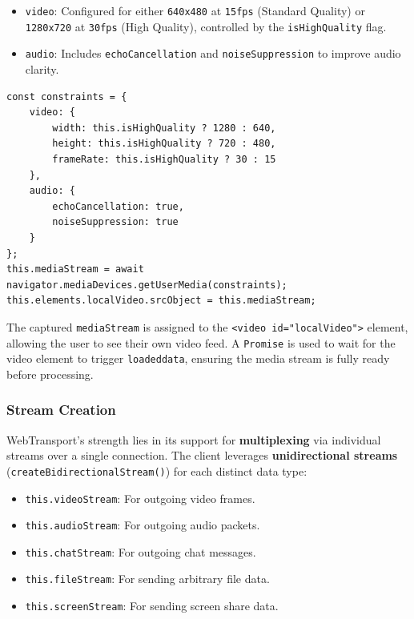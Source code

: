 \begin{itemize}
    \item \texttt{video}: Configured for either \texttt{640x480} at \texttt{15fps} (Standard Quality) or \texttt{1280x720} at \texttt{30fps} (High Quality), controlled by the \texttt{isHighQuality} flag.
    \item \texttt{audio}: Includes \texttt{echoCancellation} and \texttt{noiseSuppression} to improve audio clarity.
\end{itemize}

\begin{lstlisting}[breaklines=true,basicstyle=\small\ttfamily,frame=single]
const constraints = {
    video: {
        width: this.isHighQuality ? 1280 : 640,
        height: this.isHighQuality ? 720 : 480,
        frameRate: this.isHighQuality ? 30 : 15
    },
    audio: {
        echoCancellation: true,
        noiseSuppression: true
    }
};
this.mediaStream = await navigator.mediaDevices.getUserMedia(constraints);
this.elements.localVideo.srcObject = this.mediaStream;
\end{lstlisting}

The captured \texttt{mediaStream} is assigned to the \texttt{<video id="localVideo">} element, allowing the user to see their own video feed. A \texttt{Promise} is used to wait for the video element to trigger \texttt{loadeddata}, ensuring the media stream is fully ready before processing.

\subsubsection{Stream Creation}
WebTransport's strength lies in its support for \textbf{multiplexing} via individual streams over a single connection. The client leverages \textbf{unidirectional streams} (\texttt{create\allowbreak{}Bidirectional\allowbreak{}Stream()}) for each distinct data type:

\begin{itemize}
    \item \texttt{this.videoStream}: For outgoing video frames.
    \item \texttt{this.audioStream}: For outgoing audio packets.
    \item \texttt{this.chatStream}: For outgoing chat messages.
    \item \texttt{this.fileStream}: For sending arbitrary file data.
    \item \texttt{this.screenStream}: For sending screen share data.
\end{itemize}

